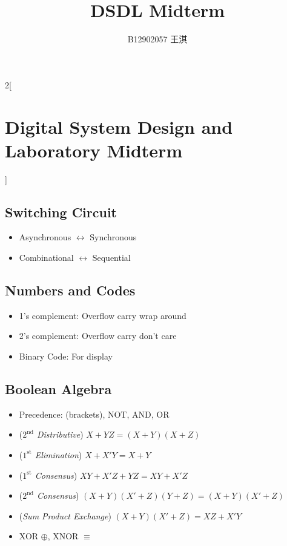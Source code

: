 \documentclass[12pt,a4paper,twoside]{article}
\title{DSDL \textbf{Midterm}}
\author{B12902057 王淇}
\date{}
\begin{document}
	\begin{multicols}{2}[\section*{Digital System Design and Laboratory Midterm}]
		\subsection*{Switching Circuit}
		\begin{itemize}
			\item Asynchronous $\leftrightarrow$ Synchronous
			\item Combinational $\leftrightarrow$ Sequential 
		\end{itemize}
		\subsection*{Numbers and Codes}
		\begin{itemize}
			\item 1's complement: Overflow carry wrap around
			\item 2's complement: Overflow carry don't care
			\item Binary Code: For display
		\end{itemize}
		\subsection*{Boolean Algebra}
		\begin{itemize}
			\item Precedence: (brackets), NOT, AND, OR
			\item (\textit{$2^{\text{nd}}$ Distributive}) $X + YZ = (X + Y)(X + Z)$
			\item (\textit{$1^{\text{st}}$ Elimination}) $X + X'Y = X + Y$
			\item (\textit{$1^{\text{st}}$ Consensus}) $XY + X'Z + YZ = XY + X'Z$
			\item (\textit{$2^{\text{nd}}$ Consensus}) $(X + Y)(X' + Z)(Y + Z) = (X + Y)(X' + Z)$
			\item (\textit{Sum Product Exchange}) $(X + Y)(X' + Z) = XZ + X'Y$
			\item XOR $\oplus$, XNOR $\equiv$
		\end{itemize}

\end{multicols}
\end{document}
